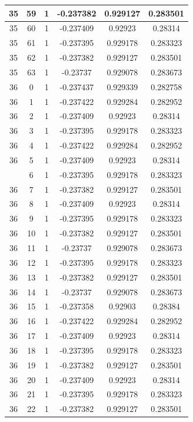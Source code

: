 \documentclass[12pt,a4paper]{article}
\numberwithin{equation}{section}
\numberwithin{figure}{section}
\numberwithin{table}{section}
\begin{document}
\begin{longtable}{|c|c|c|c|c|c|}
35 & 59 & 1 & -0.237382 & 0.929127 & 0.283501 \\ \hline
35 & 60 & 1 & -0.237409 & 0.92923 & 0.28314 \\ \hline
35 & 61 & 1 & -0.237395 & 0.929178 & 0.283323 \\ \hline
35 & 62 & 1 & -0.237382 & 0.929127 & 0.283501 \\ \hline
35 & 63 & 1 & -0.23737 & 0.929078 & 0.283673 \\ \hline
36 & 0 & 1 & -0.237437 & 0.929339 & 0.282758 \\ \hline
36 & 1 & 1 & -0.237422 & 0.929284 & 0.282952 \\ \hline
36 & 2 & 1 & -0.237409 & 0.92923 & 0.28314 \\ \hline
36 & 3 & 1 & -0.237395 & 0.929178 & 0.283323 \\ \hline
36 & 4 & 1 & -0.237422 & 0.929284 & 0.282952 \\ \hline
36 & 5 & 1 & -0.237409 & 0.92923 & 0.28314 \\ \hline
\pagebreak
36 & 6 & 1 & -0.237395 & 0.929178 & 0.283323 \\ \hline
36 & 7 & 1 & -0.237382 & 0.929127 & 0.283501 \\ \hline
36 & 8 & 1 & -0.237409 & 0.92923 & 0.28314 \\ \hline
36 & 9 & 1 & -0.237395 & 0.929178 & 0.283323 \\ \hline
36 & 10 & 1 & -0.237382 & 0.929127 & 0.283501 \\ \hline
36 & 11 & 1 & -0.23737 & 0.929078 & 0.283673 \\ \hline
36 & 12 & 1 & -0.237395 & 0.929178 & 0.283323 \\ \hline
36 & 13 & 1 & -0.237382 & 0.929127 & 0.283501 \\ \hline
36 & 14 & 1 & -0.23737 & 0.929078 & 0.283673 \\ \hline
36 & 15 & 1 & -0.237358 & 0.92903 & 0.28384 \\ \hline
36 & 16 & 1 & -0.237422 & 0.929284 & 0.282952 \\ \hline
36 & 17 & 1 & -0.237409 & 0.92923 & 0.28314 \\ \hline
36 & 18 & 1 & -0.237395 & 0.929178 & 0.283323 \\ \hline
36 & 19 & 1 & -0.237382 & 0.929127 & 0.283501 \\ \hline
36 & 20 & 1 & -0.237409 & 0.92923 & 0.28314 \\ \hline
36 & 21 & 1 & -0.237395 & 0.929178 & 0.283323 \\ \hline
36 & 22 & 1 & -0.237382 & 0.929127 & 0.283501 \\ \hline

\end{longtable}
\end{document}
